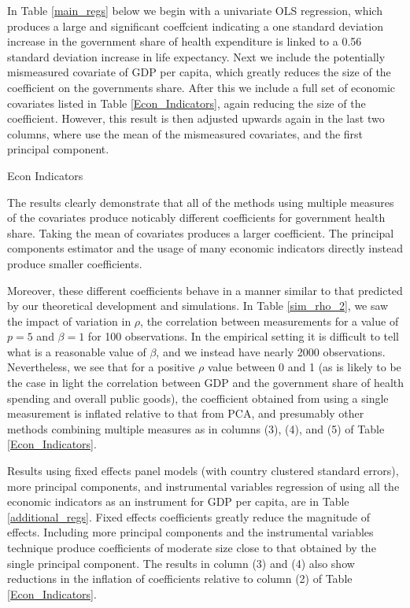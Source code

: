 \documentclass[12pt]{article}
\begin{document}
        In Table \ref{main_regs} below we begin with a univariate OLS regression, which produces a large and significant coeffcient indicating a one standard deviation increase in the government share of health expenditure is linked to a 0.56 standard deviation increase in life expectancy. Next we include the potentially mismeasured covariate of GDP per capita, which greatly reduces the size of the coefficient on the governments share. After this we include a full set of economic covariates listed in Table \ref{Econ_Indicators}, again reducing the size of the coefficient. However, this result is then adjusted upwards again in the last two columns, where use the mean of the mismeasured covariates, and the first principal component.

        

        \begin{table}[!htbp] \centering
            \caption{Econ Indicators \label{Econ_Indicators}}
            
        \end{table}

        The results clearly demonstrate that all of the methods using multiple measures of the covariates produce noticably different coefficients for government health share. Taking the mean of covariates produces a larger coefficient. The principal components estimator and the usage of many economic indicators directly instead produce smaller coefficients.

        Moreover, these different coefficients behave in a manner similar to that predicted by our theoretical development and simulations. In Table \ref{sim_rho_2}, we saw the impact of variation in $\rho$, the correlation between measurements for a value of $p = 5$ and $\beta = 1$ for 100 observations. In the empirical setting it is difficult to tell what is a reasonable value of $\beta$, and we instead have nearly 2000 observations. Nevertheless, we see that for a positive $\rho$ value between 0 and 1 (as is likely to be the case in light the correlation between GDP and the government share of health spending and overall public goods), the coefficient obtained from using a single measurement is inflated relative to that from PCA, and presumably other methods combining multiple measures as in columns (3), (4), and (5) of Table \ref{Econ_Indicators}.

        Results using fixed effects panel models (with country clustered standard errors), more principal components, and instrumental variables regression of using all the economic indicators as an instrument for GDP per capita, are in Table \ref{additional_regs}. Fixed effects coefficients greatly reduce the magnitude of effects. Including more principal components and the instrumental variables technique produce coefficients of moderate size close to that obtained by the single principal component. The results in column (3) and (4) also show reductions in the inflation of coefficients relative to column (2) of Table \ref{Econ_Indicators}.
\end{document}
